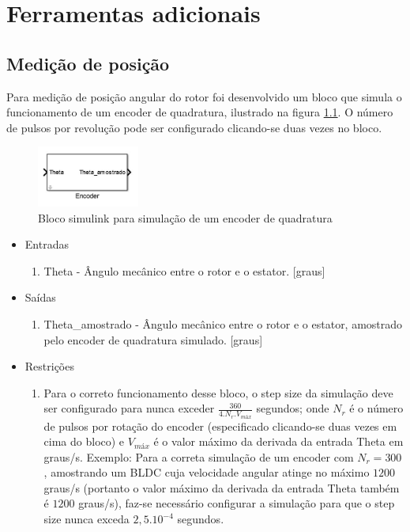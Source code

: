 \chapter{Ferramentas adicionais}

    \section{Medição de posição}
        Para medição de posição angular do rotor foi desenvolvido um bloco que simula o funcionamento de um encoder de quadratura, ilustrado na figura \ref{fig:bloco_encoder}. O número de pulsos por revolução pode ser configurado clicando-se duas vezes no bloco.
        \begin{figure}[ht]
            \centering
            \includegraphics[width=0.3\textwidth]{bloco_encoder}
            \caption{Bloco simulink para simulação de um encoder de quadratura}
            \label{fig:bloco_encoder}
        \end{figure}

        \begin{itemize}
            \item Entradas
                \begin{enumerate}
                    \item Theta - Ângulo mecânico entre o rotor e o estator. [graus]
                \end{enumerate}
            \item Saídas
                \begin{enumerate}
                    \item Theta\_amostrado - Ângulo mecânico entre o rotor e o estator, amostrado pelo encoder de quadratura simulado. [graus]
                \end{enumerate}
            \item Restrições
                \begin{enumerate}
                    \item Para o correto funcionamento desse bloco, o step size da simulação deve ser configurado para nunca exceder $\frac{360}{4.N_r.V_{máx}}$ segundos; onde $N_r$ é o número de pulsos por rotação do encoder (especificado clicando-se duas vezes em cima do bloco) e $V_{máx}$ é o valor máximo da derivada da entrada Theta em graus/s. Exemplo: Para a correta simulação de um encoder com $N_r=300$, amostrando um BLDC cuja velocidade angular atinge no máximo $1200$ graus/s (portanto o valor máximo da derivada da entrada Theta também é $1200$ graus/s), faz-se necessário configurar a simulação para que o step size nunca exceda $2,5 . 10^{-4}$ segundos.
                \end{enumerate}
        \end{itemize}

